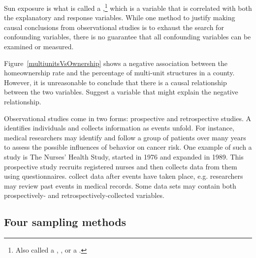 Sun exposure is what is called a ,\footnote{Also called a , , or a .} which is a variable that is correlated with both the explanatory and response variables. While one method to justify making causal conclusions from observational studies is to exhaust the search for confounding variables, there is no guarantee that all confounding variables can be examined or measured.


\begin{exercisewrap}
\begin{nexercise}
Figure~\ref{multiunitsVsOwnership} shows a negative association
between the homeownership rate and the percentage of multi-unit
structures in a county.
However, it is unreasonable to conclude that there is a causal
relationship between the two variables.
Suggest a variable that might explain the negative
relationship.\footnotemark
\end{nexercise}
\end{exercisewrap}

Observational studies come in two forms:
prospective and retrospective studies.
A  identifies individuals
and collects information as events unfold.
For instance, medical researchers may identify and follow
a group of patients over many years to assess
the possible influences of behavior on cancer risk.
One example of such a study is The Nurses' Health Study,
started in 1976 and expanded in 1989.
This prospective study recruits registered nurses and then
collects data from them using questionnaires.
collect data after events have taken place,
e.g. researchers may review past events in medical records.
Some data sets may contain both prospectively- and
retrospectively-collected variables.


\subsection{Four sampling methods}
\label{fourSamplingMethods}
\label{threeSamplingMethods}

